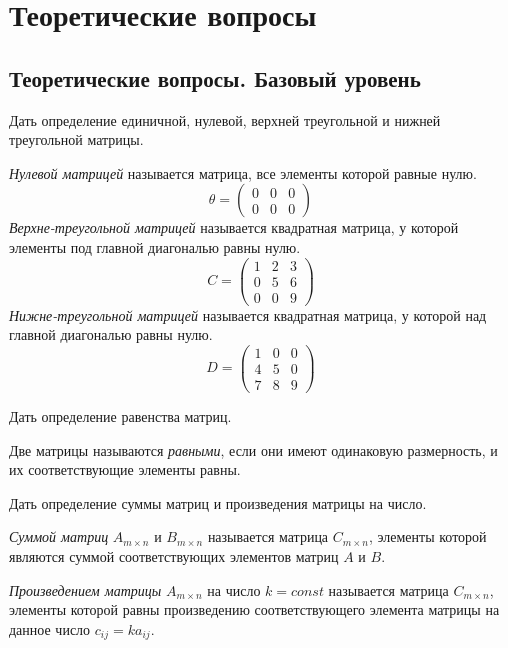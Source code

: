 
\section{Теоретические вопросы}

\subsection{Теоретические вопросы. Базовый уровень}

\begin{question}
  Дать определение единичной, нулевой, верхней треугольной и нижней треугольной матрицы.
\end{question}
\begin{answer}
  \textit{Нулевой матрицей} называется матрица, все элементы которой равные нулю. \[
  \theta = \begin{pmatrix}
    0 & 0 & 0 \\
    0 & 0 & 0
  \end{pmatrix}
\]
  \textit{Верхне-треугольной матрицей} называется квадратная матрица, у которой элементы под главной диагональю равны нулю. \[
  C = \begin{pmatrix}
    1 & 2 & 3 \\
    0 & 5 & 6 \\
    0 & 0 & 9
  \end{pmatrix}
  \] 
  \textit{Нижне-треугольной матрицей} называется квадратная матрица, у которой над главной диагональю равны нулю. \[
  D = \begin{pmatrix}
    1 & 0 & 0 \\
    4 & 5 & 0 \\
    7 & 8 & 9
  \end{pmatrix}
\]
\end{answer} 

\begin{question}
  Дать определение равенства матриц.
\end{question} 
\begin{answer}
  Две матрицы называются \textit{равными}, если они имеют одинаковую размерность, и их соответствующие элементы равны. 
\end{answer} 

\begin{question}
  Дать определение суммы матриц и произведения матрицы на число.
\end{question} 
\begin{answer}
  \textit{Суммой матриц} $A_{m \times n}$ и $B_{m \times n}$ называется матрица $C_{m \times n}$, элементы которой являются суммой соответствующих элементов матриц $A$ и $B$. 

  \textit{Произведением матрицы} $A_{m \times n}$ на число $k = const$ называется матрица $C_{m \times n}$, элементы которой равны произведению соответствующего элемента матрицы на данное число $c_{ij} = k a_{ij}$.
\end{answer} 

